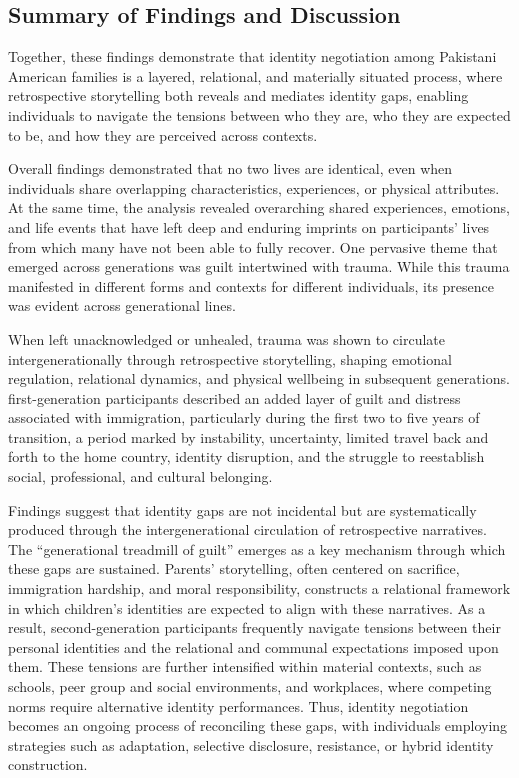 \subsection{Summary of Findings and Discussion}

Together, these findings demonstrate that identity negotiation among Pakistani American families is a layered, relational, and materially situated process, where retrospective storytelling both reveals and mediates identity gaps, enabling individuals to navigate the tensions between who they are, who they are expected to be, and how they are perceived across contexts.

Overall findings demonstrated that no two lives are identical, even when individuals share overlapping characteristics, experiences, or physical attributes. At the same time, the analysis revealed overarching shared experiences, emotions, and life events that have left deep and enduring imprints on participants’ lives from which many have not been able to fully recover. One pervasive theme that emerged across generations was guilt intertwined with trauma. While this trauma manifested in different forms and contexts for different individuals, its presence was evident across generational lines.

When left unacknowledged or unhealed, trauma was shown to circulate intergenerationally through retrospective storytelling, shaping emotional regulation, relational dynamics, and physical wellbeing in subsequent generations. first-generation participants described an added layer of guilt and distress associated with immigration, particularly during the first two to five years of transition, a period marked by instability, uncertainty, limited travel back and forth to the home country, identity disruption, and the struggle to reestablish social, professional, and cultural belonging.

Findings suggest that identity gaps are not incidental but are systematically produced through the intergenerational circulation of retrospective narratives. The ``generational treadmill of guilt'' emerges as a key mechanism through which these gaps are sustained. Parents’ storytelling, often centered on sacrifice, immigration hardship, and moral responsibility, constructs a relational framework in which children’s identities are expected to align with these narratives. As a result, second-generation participants frequently navigate tensions between their personal identities and the relational and communal expectations imposed upon them. These tensions are further intensified within material contexts, such as schools, peer group and social environments, and workplaces, where competing norms require alternative identity performances. Thus, identity negotiation becomes an ongoing process of reconciling these gaps, with individuals employing strategies such as adaptation, selective disclosure, resistance, or hybrid identity construction.

